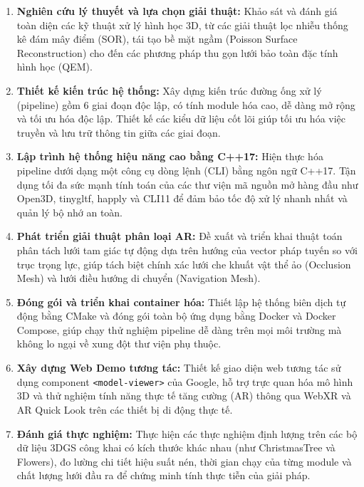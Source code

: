 \documentclass[a4paper,12pt]{report}
\begin{document}
\begin{enumerate}[label=\arabic*.]
    \item \textbf{Nghiên cứu lý thuyết và lựa chọn giải thuật:} Khảo sát và đánh giá toàn diện các kỹ thuật xử lý hình học 3D, từ các giải thuật lọc nhiễu thống kê đám mây điểm (SOR), tái tạo bề mặt ngầm (Poisson Surface Reconstruction) cho đến các phương pháp thu gọn lưới bảo toàn đặc tính hình học (QEM).
    \item \textbf{Thiết kế kiến trúc hệ thống:} Xây dựng kiến trúc đường ống xử lý (pipeline) gồm 6 giai đoạn độc lập, có tính module hóa cao, dễ dàng mở rộng và tối ưu hóa độc lập. Thiết kế các kiểu dữ liệu cốt lõi giúp tối ưu hóa việc truyền và lưu trữ thông tin giữa các giai đoạn.
    \item \textbf{Lập trình hệ thống hiệu năng cao bằng C++17:} Hiện thực hóa pipeline dưới dạng một công cụ dòng lệnh (CLI) bằng ngôn ngữ C++17. Tận dụng tối đa sức mạnh tính toán của các thư viện mã nguồn mở hàng đầu như Open3D, tinygltf, happly và CLI11 để đảm bảo tốc độ xử lý nhanh nhất và quản lý bộ nhớ an toàn.
    \item \textbf{Phát triển giải thuật phân loại AR:} Đề xuất và triển khai thuật toán phân tách lưới tam giác tự động dựa trên hướng của vector pháp tuyến so với trục trọng lực, giúp tách biệt chính xác lưới che khuất vật thể ảo (Occlusion Mesh) và lưới điều hướng di chuyển (Navigation Mesh).
    \item \textbf{Đóng gói và triển khai container hóa:} Thiết lập hệ thống biên dịch tự động bằng CMake và đóng gói toàn bộ ứng dụng bằng Docker và Docker Compose, giúp chạy thử nghiệm pipeline dễ dàng trên mọi môi trường mà không lo ngại về xung đột thư viện phụ thuộc.
    \item \textbf{Xây dựng Web Demo tương tác:} Thiết kế giao diện web tương tác sử dụng component \texttt{<model-viewer>} của Google, hỗ trợ trực quan hóa mô hình 3D và thử nghiệm tính năng thực tế tăng cường (AR) thông qua WebXR và AR Quick Look trên các thiết bị di động thực tế.
    \item \textbf{Đánh giá thực nghiệm:} Thực hiện các thực nghiệm định lượng trên các bộ dữ liệu 3DGS công khai có kích thước khác nhau (như ChristmasTree và Flowers), đo lường chi tiết hiệu suất nén, thời gian chạy của từng module và chất lượng lưới đầu ra để chứng minh tính thực tiễn của giải pháp.
\end{enumerate}

\newpage

\tableofcontents
\newpage
\listoffigures
\listoftables
\newpage
\end{document}
